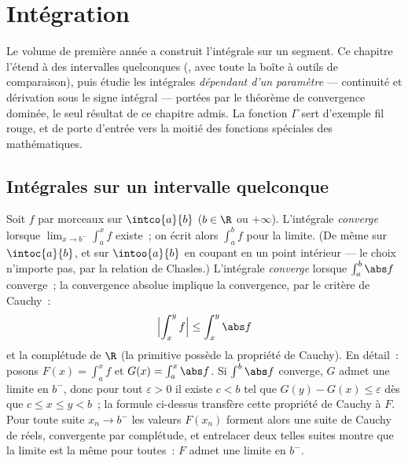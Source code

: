 \chapter{Intégration}\label{ch:b2:integration}

Le volume de première année a construit l'intégrale sur un segment. Ce
chapitre l'étend à des intervalles quelconques (,
avec toute la boîte à outils de comparaison), puis étudie les
intégrales \emph{dépendant d'un paramètre} --- continuité et dérivation
sous le signe intégral --- portées par le théorème de convergence
dominée, le seul résultat de ce chapitre admis. La fonction $\Gamma$
sert d'exemple fil rouge, et de porte d'entrée vers la moitié des
fonctions spéciales des mathématiques.

\section{Intégrales sur un intervalle quelconque}

\begin{definition}\label{def:b2:integration:improper}
Soit $f$  par morceaux sur $\intco{a}{b}$ ($b \in \R$ ou
$+\infty$). L'intégrale \emph{converge}
lorsque $\lim_{x \to b^-} \int_a^x f$ existe~; on écrit alors
$\int_a^b f$ pour la limite. (De même sur $\intoc{a}{b}$, et sur
$\intoo{a}{b}$ en coupant en un point intérieur --- le choix
n'importe pas, par la relation de Chasles.) L'intégrale \emph{converge
} lorsque $\int_a^b \abs f$ converge~; la convergence absolue
implique la convergence, par le critère de Cauchy~:
\[
\Bigl| \int_x^{y} f \Bigr| \leq \int_x^{y} \abs f
\]
et la complétude de $\R$ (la primitive possède la propriété de
Cauchy). En détail~: posons $F(x) = \int_a^x f$ et $G(x) = \int_a^x \abs
f$. Si $\int^b\abs f$ converge, $G$ admet une limite en $b^-$, donc
pour tout $\varepsilon > 0$ il existe $c < b$ tel que $G(y) - G(x)
\leq \varepsilon$ dès que $c \leq x \leq y < b$~; la formule ci-dessus
transfère cette propriété de Cauchy à $F$. Pour toute suite $x_n
\to b^-$ les valeurs $F(x_n)$ forment alors une suite de Cauchy de
réels, convergente par complétude, et entrelacer deux telles suites
montre que la limite est la même pour toutes~: $F$ admet une limite en
$b^-$.
\end{definition}


